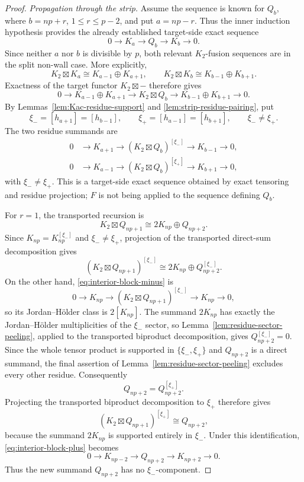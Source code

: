 \documentclass[12pt,leqno]{amsart}
\numberwithin{equation}{section}
\newcommand{\boxt}{\boxtimes}
\begin{document}
\begin{proof}
\smallskip
\noindent\emph{Propagation through the strip.}
Assume the sequence is known for $Q_b$, where
$b=np+r$, $1\le r\le p-2$, and put $a=np-r$.  Thus the inner induction
hypothesis provides the already established target-side exact sequence
\[
 0\longrightarrow K_a\longrightarrow Q_b\longrightarrow K_b
 \longrightarrow0.
\]
Since neither $a$ nor $b$ is divisible by $p$, both relevant $K_2$-fusion
sequences are in the split non-wall case.  More explicitly,
\[
 K_2\boxtimes K_a\cong K_{a-1}\oplus K_{a+1},\qquad
 K_2\boxtimes K_b\cong K_{b-1}\oplus K_{b+1}.
\]
Exactness of the target functor $K_2\boxt-$ therefore gives
\begin{equation}\label{eq:tensored-Q-sequence}
 0\longrightarrow K_{a-1}\oplus K_{a+1}
 \longrightarrow K_2\boxt Q_b
 \longrightarrow K_{b-1}\oplus K_{b+1}\longrightarrow0.
\end{equation}
By Lemmas~\ref{lem:Kac-residue-support} and
\ref{lem:strip-residue-pairing}, put
\[
 \xi_-=[h_{a+1}]=[h_{b-1}],\qquad
 \xi_+=[h_{a-1}]=[h_{b+1}],\qquad \xi_-\ne\xi_+.
\]
The two residue summands are
\begin{align}
 0&\to K_{a+1}\to (K_2\boxt Q_b)^{[\xi_-]}
       \to K_{b-1}\to0,\label{eq:interior-block-minus}\\
 0&\to K_{a-1}\to (K_2\boxt Q_b)^{[\xi_+]}
       \to K_{b+1}\to0,\label{eq:interior-block-plus}
\end{align}
with $\xi_-\ne\xi_+$.  This is a target-side exact sequence obtained by
exact tensoring and residue projection; $F$ is not being applied to the
sequence defining $Q_b$.

For $r=1$, the transported recursion is
\[
 K_2\boxt Q_{np+1}\cong2K_{np}\oplus Q_{np+2}.
\]
Since $K_{np}=K_{np}^{[\xi_-]}$ and $\xi_-\ne\xi_+$, projection of the
transported direct-sum decomposition gives
\[
 (K_2\boxt Q_{np+1})^{[\xi_-]}
 \cong2K_{np}\oplus Q_{np+2}^{[\xi_-]}.
\]
On the other hand, \eqref{eq:interior-block-minus} is
\[
 0\to K_{np}\to (K_2\boxt Q_{np+1})^{[\xi_-]}
   \to K_{np}\to0,
\]
so its Jordan--H\"older class is $2[K_{np}]$.  The summand $2K_{np}$ has exactly the Jordan--H\"older multiplicities
of the $\xi_-$ sector, so Lemma~\ref{lem:residue-sector-peeling}, applied
to the transported biproduct decomposition, gives
$Q_{np+2}^{[\xi_-]}=0$.  Since the whole tensor product is supported in
$\{\xi_-,\xi_+\}$ and $Q_{np+2}$ is a direct summand, the final assertion
of Lemma~\ref{lem:residue-sector-peeling} excludes every other residue.
Consequently
\[
 Q_{np+2}=Q_{np+2}^{[\xi_+]}.
\]
Projecting the transported biproduct decomposition to $\xi_+$ therefore
gives
\[
 (K_2\boxt Q_{np+1})^{[\xi_+]}
 \cong Q_{np+2},
\]
because the summand $2K_{np}$ is supported entirely in $\xi_-$.  Under
this identification, \eqref{eq:interior-block-plus} becomes
\[
 0\to K_{np-2}\to Q_{np+2}\to K_{np+2}\to0.
\]
Thus the new summand $Q_{np+2}$ has no $\xi_-$-component.


\end{proof}
\end{document}
